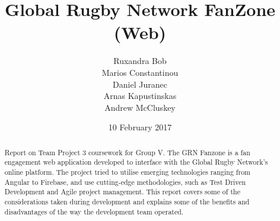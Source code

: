 \documentclass{l3proj}
\begin{document}
\title{Global Rugby Network FanZone (Web)}
\author{Ruxandra Bob \\
		Marios Constantinou \\
        Daniel Juranec \\
        Arnas Kapustinskas \\
        Andrew McCluskey}
\date{10 February 2017}
\maketitle
\begin{abstract}
Report on Team Project 3 coursework for Group V. The GRN Fanzone is a
 fan engagement web application developed to interface with the Global Rugby
 Network's online platform. The project tried to utilise 
 emerging technologies ranging from Angular to Firebase, and use
 cutting-edge methodologies, such as Test Driven Development and Agile
 project management. This report covers some of the considerations taken
 during development and explains some of the benefits and disadvantages
 of the way the development team operated.
\end{abstract}
\educationalconsent
\newpage
\end{document}
